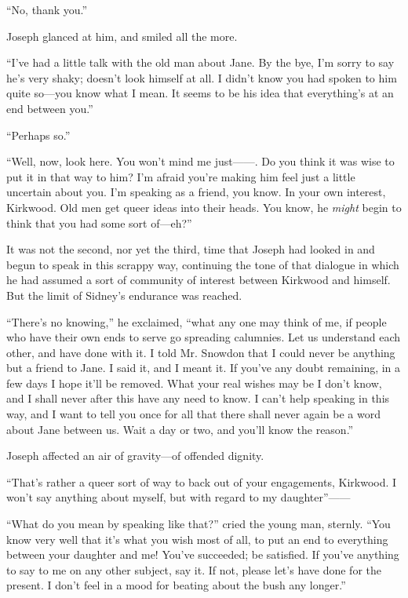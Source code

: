 ``No, thank you.''

Joseph glanced at him, and smiled all the more.

``I've had a little talk with the old man about Jane. By the bye, I'm
sorry to say he's very shaky; doesn't look himself at all. I didn't know
you had spoken to him quite so---you know what I mean. It seems to be
his idea that everything's at an end between you.''

``Perhaps so.''

``Well, now, look here. You won't mind me just{{------}}. Do you think
it was wise to put it in that way to him? I'm afraid you're making him
feel just a little uncertain about you. I'm speaking as a friend, you
know. In your own interest, Kirkwood. Old men get queer ideas {}into
their heads. You know, he \emph{might} begin to think that you had some
sort of---eh?''

It was not the second, nor yet the third, time that Joseph had looked in
and begun to speak in this scrappy way, continuing the tone of that
dialogue in which he had assumed a sort of community of interest between
Kirkwood and himself. But the limit of Sidney's endurance was reached.

``There's no knowing,'' he exclaimed, ``what any one may think of me, if
people who have their own ends to serve go spreading calumnies. Let us
understand each other, and have done with it. I told Mr. Snowdon that I
could never be anything but a friend to Jane. I said it, and I meant it.
If you've any doubt remaining, in a few days I hope it'll be removed.
What your real wishes may be I don't know, and I shall never after this
have any need to know. I can't help speaking in this way, and I want to
tell you once for all that there shall never again be a word about Jane
between us. Wait a day or two, and you'll know the reason.''

Joseph affected an air of gravity---of offended dignity.

{}``That's rather a queer sort of way to back out of your engagements,
Kirkwood. I won't say anything about myself, but with regard to my
daughter''{{------}}

``What do you mean by speaking like that?'' cried the young man,
sternly. ``You know very well that it's what you wish most of all, to
put an end to everything between your daughter and me! You've succeeded;
be satisfied. If you've anything to say to me on any other subject, say
it. If not, please let's have done for the present. I don't feel in a
mood for beating about the bush any longer.''

